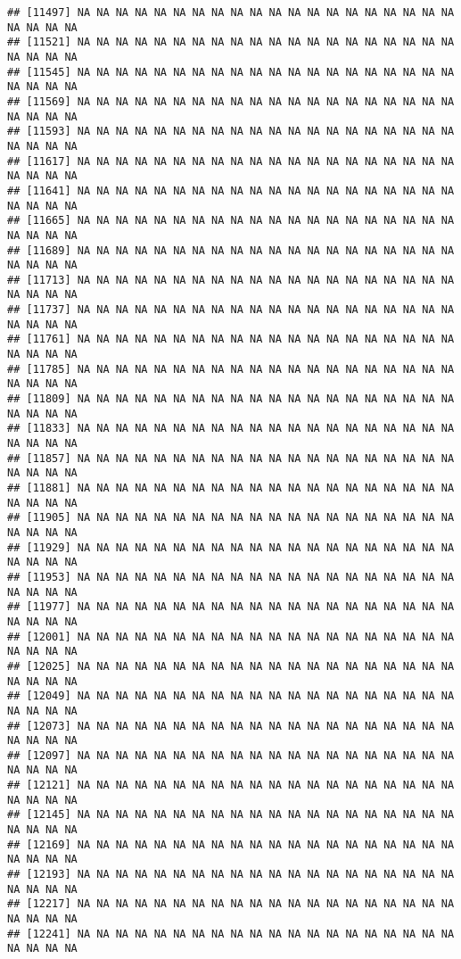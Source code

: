 \documentclass[
]{article}
\begin{document}
\begin{verbatim}
## [11497] NA NA NA NA NA NA NA NA NA NA NA NA NA NA NA NA NA NA NA NA NA NA NA NA
## [11521] NA NA NA NA NA NA NA NA NA NA NA NA NA NA NA NA NA NA NA NA NA NA NA NA
## [11545] NA NA NA NA NA NA NA NA NA NA NA NA NA NA NA NA NA NA NA NA NA NA NA NA
## [11569] NA NA NA NA NA NA NA NA NA NA NA NA NA NA NA NA NA NA NA NA NA NA NA NA
## [11593] NA NA NA NA NA NA NA NA NA NA NA NA NA NA NA NA NA NA NA NA NA NA NA NA
## [11617] NA NA NA NA NA NA NA NA NA NA NA NA NA NA NA NA NA NA NA NA NA NA NA NA
## [11641] NA NA NA NA NA NA NA NA NA NA NA NA NA NA NA NA NA NA NA NA NA NA NA NA
## [11665] NA NA NA NA NA NA NA NA NA NA NA NA NA NA NA NA NA NA NA NA NA NA NA NA
## [11689] NA NA NA NA NA NA NA NA NA NA NA NA NA NA NA NA NA NA NA NA NA NA NA NA
## [11713] NA NA NA NA NA NA NA NA NA NA NA NA NA NA NA NA NA NA NA NA NA NA NA NA
## [11737] NA NA NA NA NA NA NA NA NA NA NA NA NA NA NA NA NA NA NA NA NA NA NA NA
## [11761] NA NA NA NA NA NA NA NA NA NA NA NA NA NA NA NA NA NA NA NA NA NA NA NA
## [11785] NA NA NA NA NA NA NA NA NA NA NA NA NA NA NA NA NA NA NA NA NA NA NA NA
## [11809] NA NA NA NA NA NA NA NA NA NA NA NA NA NA NA NA NA NA NA NA NA NA NA NA
## [11833] NA NA NA NA NA NA NA NA NA NA NA NA NA NA NA NA NA NA NA NA NA NA NA NA
## [11857] NA NA NA NA NA NA NA NA NA NA NA NA NA NA NA NA NA NA NA NA NA NA NA NA
## [11881] NA NA NA NA NA NA NA NA NA NA NA NA NA NA NA NA NA NA NA NA NA NA NA NA
## [11905] NA NA NA NA NA NA NA NA NA NA NA NA NA NA NA NA NA NA NA NA NA NA NA NA
## [11929] NA NA NA NA NA NA NA NA NA NA NA NA NA NA NA NA NA NA NA NA NA NA NA NA
## [11953] NA NA NA NA NA NA NA NA NA NA NA NA NA NA NA NA NA NA NA NA NA NA NA NA
## [11977] NA NA NA NA NA NA NA NA NA NA NA NA NA NA NA NA NA NA NA NA NA NA NA NA
## [12001] NA NA NA NA NA NA NA NA NA NA NA NA NA NA NA NA NA NA NA NA NA NA NA NA
## [12025] NA NA NA NA NA NA NA NA NA NA NA NA NA NA NA NA NA NA NA NA NA NA NA NA
## [12049] NA NA NA NA NA NA NA NA NA NA NA NA NA NA NA NA NA NA NA NA NA NA NA NA
## [12073] NA NA NA NA NA NA NA NA NA NA NA NA NA NA NA NA NA NA NA NA NA NA NA NA
## [12097] NA NA NA NA NA NA NA NA NA NA NA NA NA NA NA NA NA NA NA NA NA NA NA NA
## [12121] NA NA NA NA NA NA NA NA NA NA NA NA NA NA NA NA NA NA NA NA NA NA NA NA
## [12145] NA NA NA NA NA NA NA NA NA NA NA NA NA NA NA NA NA NA NA NA NA NA NA NA
## [12169] NA NA NA NA NA NA NA NA NA NA NA NA NA NA NA NA NA NA NA NA NA NA NA NA
## [12193] NA NA NA NA NA NA NA NA NA NA NA NA NA NA NA NA NA NA NA NA NA NA NA NA
## [12217] NA NA NA NA NA NA NA NA NA NA NA NA NA NA NA NA NA NA NA NA NA NA NA NA
## [12241] NA NA NA NA NA NA NA NA NA NA NA NA NA NA NA NA NA NA NA NA NA NA NA NA

\end{verbatim}
\end{document}
